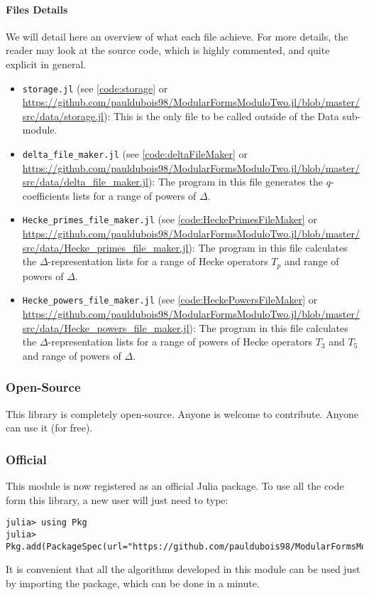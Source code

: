 \paragraph{Files Details}
We will detail here an overview of what each file achieve.
For more details, the reader may look at the source code, which is highly commented, and quite explicit in general.
\begin{itemize}
	\item \texttt{storage.jl} (see \ref{code:storage} or \url{https://github.com/pauldubois98/ModularFormsModuloTwo.jl/blob/master/src/data/storage.jl}): This is the only file to be called outside of the Data sub-module.
	\item \texttt{delta\_file\_maker.jl} (see \ref{code:deltaFileMaker} or \url{https://github.com/pauldubois98/ModularFormsModuloTwo.jl/blob/master/src/data/delta_file_maker.jl}): The program in this file generates the $q$-coefficients lists for a range of powers of $\Delta$.
	\item \texttt{Hecke\_primes\_file\_maker.jl} (see \ref{code:HeckePrimesFileMaker} or \url{https://github.com/pauldubois98/ModularFormsModuloTwo.jl/blob/master/src/data/Hecke_primes_file_maker.jl}): The program in this file calculates the $\Delta$-representation lists for a range of Hecke operators $T_p$ and range of powers of $\Delta$.
	\item \texttt{Hecke\_powers\_file\_maker.jl} (see \ref{code:HeckePowersFileMaker} or \url{https://github.com/pauldubois98/ModularFormsModuloTwo.jl/blob/master/src/data/Hecke_powers_file_maker.jl}): The program in this file calculates the $\Delta$-representation lists for a range of powers of Hecke operators $T_3$ and $T_5$ and range of powers of $\Delta$.
\end{itemize}



\subsubsection{Open-Source}
This library is completely open-source.
Anyone is welcome to contribute.
Anyone can use it (for free).

\subsubsection{Official}
This module is now registered as an official Julia package.
To use all the code form this library, a new user will just need to type:
\begin{verbatim}
julia> using Pkg
julia> Pkg.add(PackageSpec(url="https://github.com/pauldubois98/ModularFormsModuloTwo.jl"))
\end{verbatim}
It is convenient that all the algorithms developed in this module can be used just by importing the package, which can be done in a minute.

